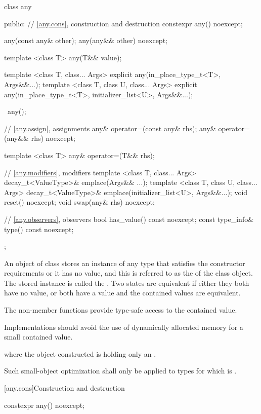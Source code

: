 \begin{codeblock}
class any {
public:
  // \ref{any.cons}, construction and destruction
  constexpr any() noexcept;

  any(const any& other);
  any(any&& other) noexcept;

  template <class T> any(T&& value);

  template <class T, class... Args>
    explicit any(in_place_type_t<T>, Args&&...);
  template <class T, class U, class... Args>
    explicit any(in_place_type_t<T>, initializer_list<U>, Args&&...);

  ~any();

  // \ref{any.assign}, assignments
  any& operator=(const any& rhs);
  any& operator=(any&& rhs) noexcept;

  template <class T> any& operator=(T&& rhs);

  // \ref{any.modifiers}, modifiers
  template <class T, class... Args>
    decay_t<ValueType>& emplace(Args&& ...);
  template <class T, class U, class... Args>
    decay_t<ValueType>& emplace(initializer_list<U>, Args&&...);
  void reset() noexcept;
  void swap(any& rhs) noexcept;

  // \ref{any.observers}, observers
  bool has_value() const noexcept;
  const type_info& type() const noexcept;
};
\end{codeblock}

\pnum
An object of class  stores an instance of any type that satisfies the constructor requirements or it has no value,
and this is referred to as the  of the class  object.
The stored instance is called the ,
Two states are equivalent if either they both have no value, or both have a value and the contained values are equivalent.

\pnum
The non-member  functions provide type-safe access to the contained value.

\pnum
Implementations should avoid the use of dynamically allocated memory for a small contained value.
\begin{example}
where the object constructed is holding only an .
\end{example}
Such small-object optimization shall only be applied to types  for which
 is .

[any.cons]{Construction and destruction}

%
\begin{itemdecl}
constexpr any() noexcept;
\end{itemdecl}

